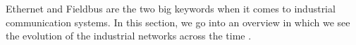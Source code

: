Ethernet and Fieldbus are the two big keywords when it comes to industrial communication systems.
In this section, we go into an overview in which we see the evolution
of the industrial networks across the time \cite{zurawski2014industrial}.



%
%
%
%
%
%
